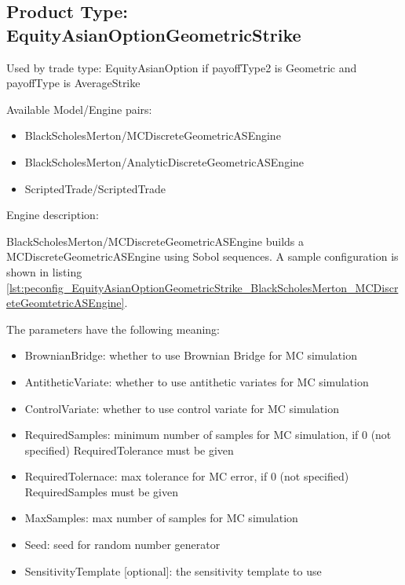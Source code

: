 \subsection{Product Type: EquityAsianOptionGeometricStrike}

Used by trade type: EquityAsianOption if payoffType2 is Geometric and payoffType is AverageStrike

Available Model/Engine pairs:

\begin{itemize}
  \item BlackScholesMerton/MCDiscreteGeometricASEngine
  \item BlackScholesMerton/AnalyticDiscreteGeometricASEngine
  \item ScriptedTrade/ScriptedTrade
\end{itemize}

Engine description:

BlackScholesMerton/MCDiscreteGeometricASEngine builds a MCDiscreteGeometricASEngine using Sobol sequences. A sample
configuration is shown in listing
\ref{lst:peconfig_EquityAsianOptionGeometricStrike_BlackScholesMerton_MCDiscreteGeomtetricASEngine}.

The parameters have the following meaning:

\begin{itemize}
\item BrownianBridge: whether to use Brownian Bridge for MC simulation
\item AntitheticVariate: whether to use antithetic variates for MC simulation
\item ControlVariate: whether to use control variate for MC simulation
\item RequiredSamples: minimum number of samples for MC simulation, if 0 (not specified) RequiredTolerance must be given
\item RequiredTolernace: max tolerance for MC error, if 0 (not specified) RequiredSamples must be given
\item MaxSamples: max number of samples for MC simulation
\item Seed: seed for random number generator
\item SensitivityTemplate [optional]: the sensitivity template to use 
\end{itemize}

